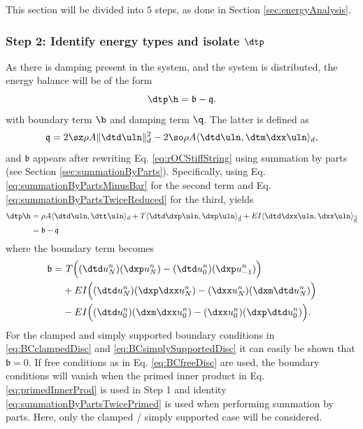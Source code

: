 {This section will be divided into $5$ steps, as done in Section \ref{sec:energyAnalysis}.

\subsubsection{Step 2: Identify energy types and isolate $\dtp$}
As there is damping present in the system, and the system is distributed, the energy balance will be of the form 
\begin{equation}
    \dtp \h = \mathfrak{b}-\mathfrak{q}.
\end{equation}
with boundary term $\b$ and damping term $\q$. The latter is defined as 
\begin{equation}\label{eq:dampingTermStiffString}
    \mathfrak{q} = 2\sz \rho A \lVert\dtd\uln\rVert_d^2 - 2 \so \rho A \langle \dtd \uln, \dtm \dxx \uln \rangle_d,
\end{equation}
and $\mathfrak{b}$ appears after rewriting Eq. \eqref{eq:rOCStiffString} using summation by parts (see Section \ref{sec:summationByParts}). Specifically, using Eq. \eqref{eq:summationByPartsMinusBar} for the second term and Eq. \eqref{eq:summationByPartsTwiceReduced} for the third, yields
\begin{align*}
    \dtp \h &= \rho A \langle \dtd \uln, \dtt \uln \rangle_d + T \langle \dtd \dxp \uln, \dxp \uln\rangle_{\underline{d}} + EI \langle \dtd \dxx \uln, \dxx \uln \rangle_{\overline{\underline{d}}} \\
    &= \mathfrak{b} - \mathfrak{q}
\end{align*}
where the boundary term becomes
\begin{align*}
    \mathfrak{b} =&\ T\Big((\dtd u_N^n)(\dxp u_N^n) - (\dtd u_0^n) (\dxp u_{-1}^n)\Big) \\
    &+ EI \Big((\dtd u_N^n)(\dxp \dxx u_N^n) - (\dxx u_N^n)(\dxm \dtd u_N^n) \Big)\\
    &- EI \Big((\dtd u_0^n)(\dxm \dxx u_0^n) - (\dxx u_0^n)(\dxp \dtd u_0^n)\Big).
\end{align*}
For the clamped and simply supported boundary conditions in \eqref{eq:BCclampedDisc} and \eqref{eq:BCsimplySupportedDisc} it can easily be shown that $\mathfrak{b} = 0$. If free conditions as in Eq. \eqref{eq:BCfreeDisc} are used, the boundary conditions will vanish when the primed inner product in Eq. \eqref{eq:primedInnerProd} is used in Step 1 and identity \eqref{eq:summationByPartsTwicePrimed} is used when performing summation by parts. Here, only the clamped / simply supported case will be considered. 


}
